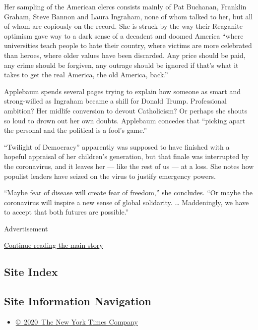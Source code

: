 Her sampling of the American clercs consists mainly of Pat Buchanan,
Franklin Graham, Steve Bannon and Laura Ingraham, none of whom talked to
her, but all of whom are copiously on the record. She is struck by the
way their Reaganite optimism gave way to a dark sense of a decadent and
doomed America ``where universities teach people to hate their country,
where victims are more celebrated than heroes, where older values have
been discarded. Any price should be paid, any crime should be forgiven,
any outrage should be ignored if that's what it takes to get the real
America, the old America, back.''

Applebaum spends several pages trying to explain how someone as smart
and strong-willed as Ingraham became a shill for Donald Trump.
Professional ambition? Her midlife conversion to devout Catholicism? Or
perhaps she shouts so loud to drown out her own doubts. Applebaum
concedes that ``picking apart the personal and the political is a fool's
game.''

``Twilight of Democracy'' apparently was supposed to have finished with
a hopeful appraisal of her children's generation, but that finale was
interrupted by the coronavirus, and it leaves her --- like the rest of
us --- at a loss. She notes how populist leaders have seized on the
virus to justify emergency powers.

``Maybe fear of disease will create fear of freedom,'' she concludes.
``Or maybe the coronavirus will inspire a new sense of global
solidarity. \ldots{} Maddeningly, we have to accept that both futures
are possible.''

Advertisement

\protect\hyperlink{after-bottom}{Continue reading the main story}

\hypertarget{site-index}{%
\subsection{Site Index}\label{site-index}}

\hypertarget{site-information-navigation}{%
\subsection{Site Information
Navigation}\label{site-information-navigation}}

\begin{itemize}
\tightlist
\item
  \href{https://help.nytimes3xbfgragh.onion/hc/en-us/articles/115014792127-Copyright-notice}{©~2020~The
  New York Times Company}
\end{itemize}

